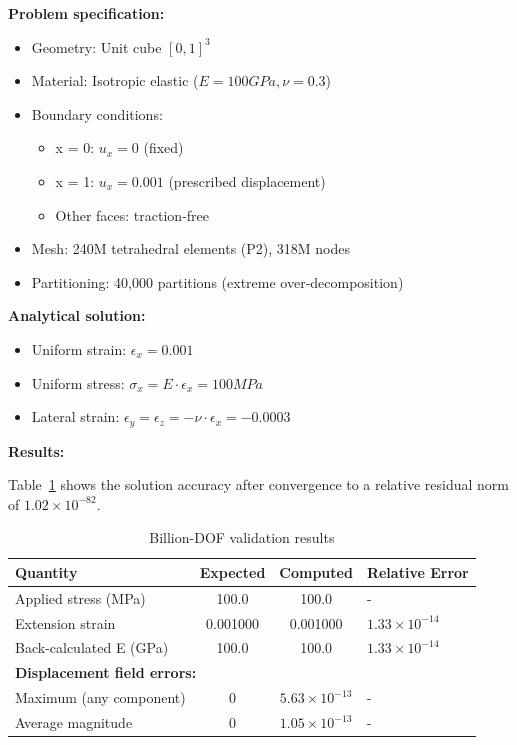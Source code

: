 \documentclass[]             %
{NASA}                       %
\begin{document}
\textbf{Problem specification:}
\begin{itemize}
\item Geometry: Unit cube ${[0,1]}^3$
\item Material: Isotropic elastic ($E = 100 GPa, \nu = 0.3$)
\item Boundary conditions:
  \begin{itemize}
  \item x = 0: $u_x = 0$ (fixed)
  \item x = 1: $u_x = 0.001$ (prescribed displacement)
  \item Other faces: traction-free
  \end{itemize}
\item Mesh: 240M tetrahedral elements (P2), 318M nodes
\item Partitioning: 40,000 partitions (extreme over-decomposition)
\end{itemize}

\textbf{Analytical solution:}
\begin{itemize}
\item Uniform strain: $\epsilon_x = 0.001$
\item Uniform stress: $\sigma_x = E \cdot \epsilon_x = 100 MPa$
\item Lateral strain: $\epsilon_y = \epsilon_z = -\nu \cdot \epsilon_x = -0.0003$
\end{itemize}

\textbf{Results:}

Table~\ref{tab:billion-dof-validation} shows the solution accuracy after
convergence to a relative residual norm of $1.02 \times 10^{-82}$.

\begin{table}[ht]
\caption{Billion-DOF validation results}
\label{tab:billion-dof-validation}
\begin{tabular}{lccl}
\toprule
Quantity & Expected & Computed & Relative Error \\
\midrule
Applied stress (MPa) & 100.0 & 100.0 & - \\
Extension strain & 0.001000 & 0.001000 & $1.33 \times 10^{-14}$ \\
Back-calculated E (GPa) & 100.0 & 100.0 & $1.33 \times 10^{-14}$ \\
\midrule
\multicolumn{4}{l}{\textbf{Displacement field errors:}} \\
Maximum (any component) & 0 & $5.63 \times 10^{-13}$ & - \\
Average magnitude & 0 & $1.05 \times 10^{-13}$ & - \\
\bottomrule
\end{tabular}
\end{table}
\end{document}
